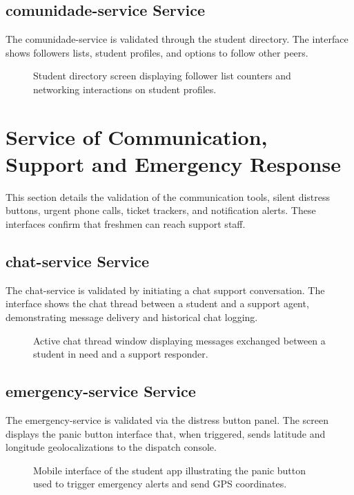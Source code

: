 \documentclass[12pt]{article}
\begin{document}
\subsection{comunidade-service Service}
The comunidade-service is validated through the student directory. The interface shows followers lists, student profiles, and options to follow other peers.

\begin{figure}[htbp]
    \centering
    \caption{Student directory screen displaying follower list counters and networking interactions on student profiles.}
    \label{fig:student_networking}
\end{figure}

\section{Service of Communication, Support and Emergency Response}
This section details the validation of the communication tools, silent distress buttons, urgent phone calls, ticket trackers, and notification alerts. These interfaces confirm that freshmen can reach support staff.

\subsection{chat-service Service}
The chat-service is validated by initiating a chat support conversation. The interface shows the chat thread between a student and a support agent, demonstrating message delivery and historical chat logging.

\begin{figure}[htbp]
    \centering
    \caption{Active chat thread window displaying messages exchanged between a student in need and a support responder.}
    \label{fig:chat_thread}
\end{figure}

\subsection{emergency-service Service}
The emergency-service is validated via the distress button panel. The screen displays the panic button interface that, when triggered, sends latitude and longitude geolocalizations to the dispatch console.

\begin{figure}[htbp]
    \centering
    \caption{Mobile interface of the student app illustrating the panic button used to trigger emergency alerts and send GPS coordinates.}
    \label{fig:emergency_trigger}
\end{figure}
\end{document}
